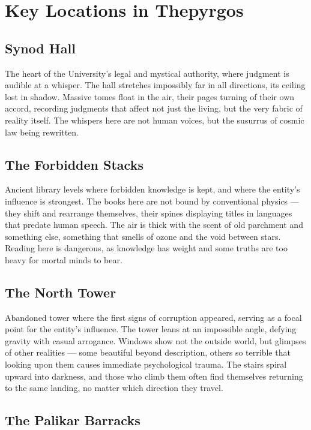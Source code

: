 \documentclass[11pt]{article}
\begin{document}
\section{Key Locations in Thepyrgos}

\subsection{Synod Hall}

The heart of the University's legal and mystical authority, where judgment is audible at a whisper. The hall stretches impossibly far in all directions, its ceiling lost in shadow. Massive tomes float in the air, their pages turning of their own accord, recording judgments that affect not just the living, but the very fabric of reality itself. The whispers here are not human voices, but the susurrus of cosmic law being rewritten.

\subsection{The Forbidden Stacks}

Ancient library levels where forbidden knowledge is kept, and where the entity's influence is strongest. The books here are not bound by conventional physics — they shift and rearrange themselves, their spines displaying titles in languages that predate human speech. The air is thick with the scent of old parchment and something else, something that smells of ozone and the void between stars. Reading here is dangerous, as knowledge has weight and some truths are too heavy for mortal minds to bear.

\subsection{The North Tower}

Abandoned tower where the first signs of corruption appeared, serving as a focal point for the entity's influence. The tower leans at an impossible angle, defying gravity with casual arrogance. Windows show not the outside world, but glimpses of other realities — some beautiful beyond description, others so terrible that looking upon them causes immediate psychological trauma. The stairs spiral upward into darkness, and those who climb them often find themselves returning to the same landing, no matter which direction they travel.

\subsection{The Palikar Barracks}
\end{document}
